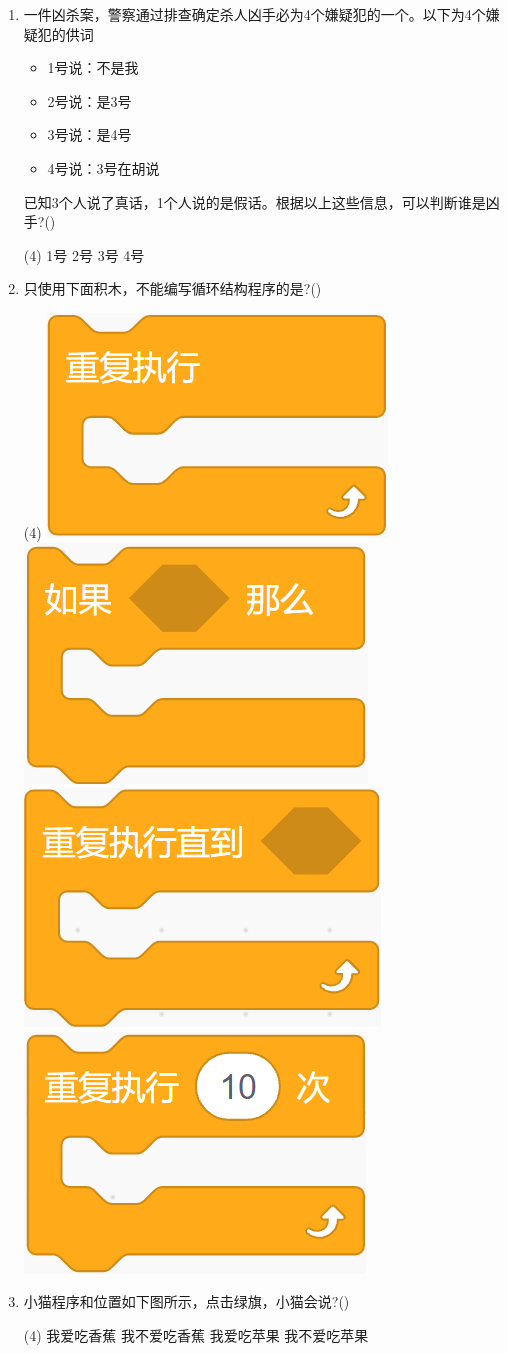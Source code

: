 \documentclass[10pt, a4paper]{article}
\begin{document}
\begin{enumerate}
        \item  一件凶杀案，警察通过排查确定杀人凶手必为4个嫌疑犯的一个。以下为4个嫌疑犯的供词
        \begin{itemize}
            \item 1号说：不是我
            \item 2号说：是3号
            \item 3号说：是4号
            \item 4号说：3号在胡说
        \end{itemize}
        已知3个人说了真话，1个人说的是假话。根据以上这些信息，可以判断谁是凶手?(\qquad)
        \begin{tasks}(4)
            \task 1号
            \task 2号
            \task 3号
            \task 4号
        \end{tasks}

        \item 只使用下面积木，不能编写循环结构程序的是?(\qquad)
        \begin{tasks}(4)
            \task \includegraphics[width=.15\textwidth]{18a.png}
            \task \includegraphics[width=.15\textwidth]{18b.png}
            \task \includegraphics[width=.15\textwidth]{18c.png}
            \task \includegraphics[width=.15\textwidth]{18d.png}
        \end{tasks}

        \item  小猫程序和位置如下图所示，点击绿旗，小猫会说?(\qquad)
        \begin{tasks}(4)
            \task 我爱吃香蕉
            \task 我不爱吃香蕉
            \task 我爱吃苹果
            \task 我不爱吃苹果
        \end{tasks}


\end{enumerate}
\end{document}
